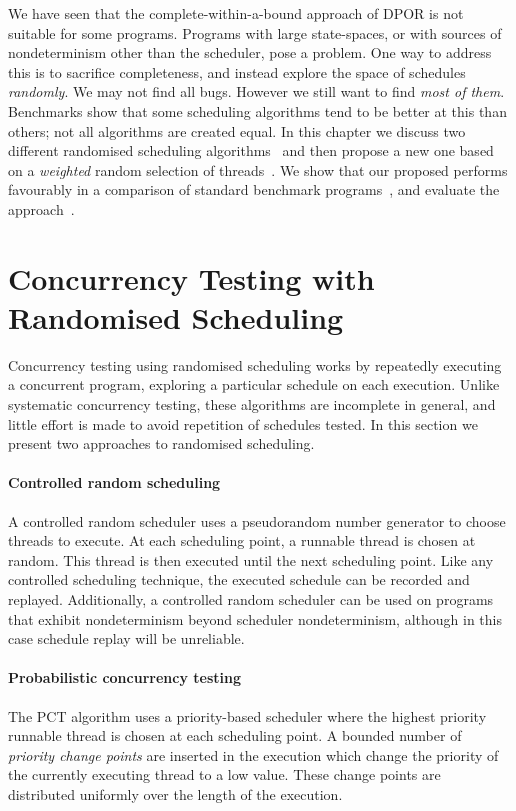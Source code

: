 We have seen that the complete-within-a-bound approach of DPOR is not
suitable for some programs.  Programs with large state-spaces, or with
sources of nondeterminism other than the scheduler, pose a problem.
One way to address this is to sacrifice completeness, and instead
explore the space of schedules \emph{randomly}.  We may not find all
bugs.  However we still want to find \emph{most of them}.  Benchmarks
show that some scheduling algorithms tend to be better at this than
others; not all algorithms are created equal.  In this chapter we
discuss two different randomised scheduling
algorithms~ and then propose a new one based on
a \emph{weighted} random selection of threads~.
We show that our proposed performs favourably in a comparison of
standard benchmark programs~, and evaluate the
approach~.

\section{Concurrency Testing with Randomised Scheduling}
\label{sec:algorithms-usual}

Concurrency testing using randomised scheduling works by repeatedly
executing a concurrent program, exploring a particular schedule on
each execution.  Unlike systematic concurrency testing, these
algorithms are incomplete in general, and little effort is made to
avoid repetition of schedules tested.  In this section we present two
approaches to randomised scheduling.

\paragraph{Controlled random scheduling}
A controlled random scheduler uses a pseudorandom number generator to
choose threads to execute.  At each scheduling point, a runnable
thread is chosen at random.  This thread is then executed until the
next scheduling point.  Like any controlled scheduling technique, the
executed schedule can be recorded and replayed.  Additionally, a
controlled random scheduler can be used on programs that exhibit
nondeterminism beyond scheduler nondeterminism, although in this case
schedule replay will be unreliable\cite{thomson2016}.

\paragraph{Probabilistic concurrency testing}
The PCT algorithm\cite{burckhardt2010} uses a priority-based scheduler where the
highest priority runnable thread is chosen at each scheduling point.  A bounded
number of \emph{priority change points} are inserted in the execution which
change the priority of the currently executing thread to a low value.  These
change points are distributed uniformly over the length of the execution.

